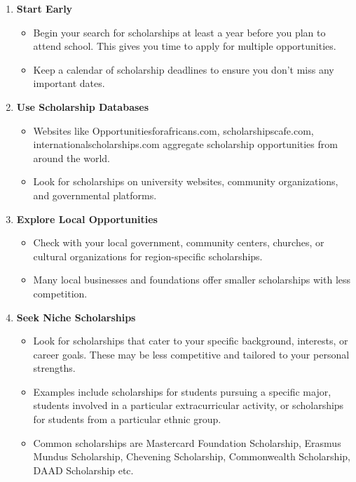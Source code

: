 \documentclass[
  letterpaper,
  DIV=11,
  numbers=noendperiod]{scrreprt}
\providecommand{\tightlist}{%
  \setlength{\itemsep}{0pt}\setlength{\parskip}{0pt}}\usepackage{longtable,booktabs,array}
\begin{document}
\begin{enumerate}
\def\labelenumi{\arabic{enumi}.}
\item
  \textbf{Start Early}

  \begin{itemize}
  \tightlist
  \item
    Begin your search for scholarships at least a year before you plan
    to attend school. This gives you time to apply for multiple
    opportunities.
  \item
    Keep a calendar of scholarship deadlines to ensure you don't miss
    any important dates.
  \end{itemize}
\item
  \textbf{Use Scholarship Databases}

  \begin{itemize}
  \tightlist
  \item
    Websites like Opportunitiesforafricans.com, scholarshipscafe.com,
    internationalscholarships.com aggregate scholarship opportunities
    from around the world.
  \item
    Look for scholarships on university websites, community
    organizations, and governmental platforms.
  \end{itemize}
\item
  \textbf{Explore Local Opportunities}

  \begin{itemize}
  \tightlist
  \item
    Check with your local government, community centers, churches, or
    cultural organizations for region-specific scholarships.
  \item
    Many local businesses and foundations offer smaller scholarships
    with less competition.
  \end{itemize}
\item
  \textbf{Seek Niche Scholarships}

  \begin{itemize}
  \tightlist
  \item
    Look for scholarships that cater to your specific background,
    interests, or career goals. These may be less competitive and
    tailored to your personal strengths.
  \item
    Examples include scholarships for students pursuing a specific
    major, students involved in a particular extracurricular activity,
    or scholarships for students from a particular ethnic group.
  \item
    Common scholarships are Mastercard Foundation Scholarship, Erasmus
    Mundus Scholarship, Chevening Scholarship, Commonwealth Scholarship,
    DAAD Scholarship etc.
  \end{itemize}
\end{enumerate}
\end{document}
